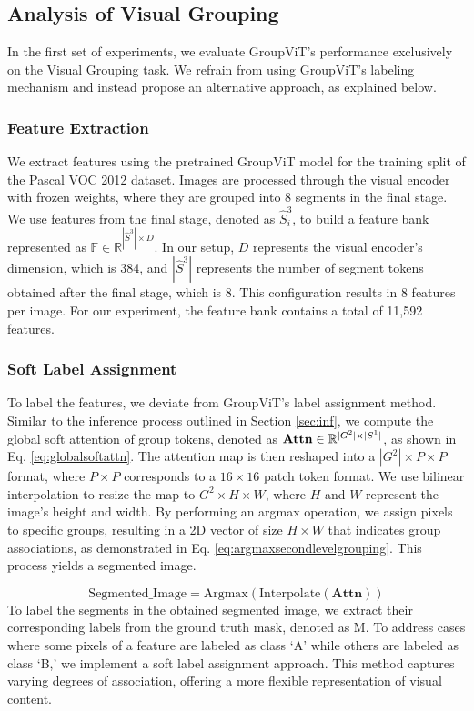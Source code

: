 \subsection{Analysis of Visual Grouping}
In the first set of experiments, we evaluate GroupViT's performance exclusively on the Visual Grouping task. We refrain from using GroupViT's labeling mechanism and instead propose an alternative approach, as explained below.

\subsubsection{Feature Extraction}
We extract features using the pretrained GroupViT model for the training split of the Pascal VOC 2012 dataset. Images are processed through the visual encoder with frozen weights, where they are grouped into 8 segments in the final stage. We use features from the final stage, denoted as ${\hat{S}_i^{3}}$, to build a feature bank represented as $\mathbb{F} \in \mathbb{R}^{|\hat{S}^3| \times D}$. In our setup, $D$ represents the visual encoder's dimension, which is 384, and $|\hat{S}^3|$ represents the number of segment tokens obtained after the final stage, which is 8. This configuration results in 8 features per image. For our experiment, the feature bank contains a total of 11,592 features.

\subsubsection{Soft Label Assignment}
To label the features, we deviate from GroupViT's label assignment method. Similar to the inference process outlined in Section \ref{sec:inf}, we compute the global soft attention of group tokens, denoted as $\text{\textbf{Attn}} \in \mathbb{R}^{|G^2| \times |S^1|}$, as shown in Eq. \ref{eq:globalsoftattn}. The attention map is then reshaped into a $|G^2| \times P \times P$ format, where $P \times P$ corresponds to a $16 \times 16$ patch token format. We use bilinear interpolation to resize the map to $G^2 \times H \times W$, where $H$ and $W$ represent the image's height and width. By performing an argmax operation, we assign pixels to specific groups, resulting in a 2D vector of size $H \times W$ that indicates group associations, as demonstrated in Eq. \ref{eq:argmaxsecondlevelgrouping}. This process yields a segmented image.

\begin{equation}
\label{eq:argmaxsecondlevelgrouping}
    \text{Segmented\_Image} = \text{Argmax}(\text{Interpolate}(\textbf{Attn}))
\end{equation}
To label the segments in the obtained segmented image, we extract their corresponding labels from the ground truth mask, denoted as M. To address cases where some pixels of a feature are labeled as class `A' while others are labeled as class `B,' we implement a soft label assignment approach. This method captures varying degrees of association, offering a more flexible representation of visual content.

